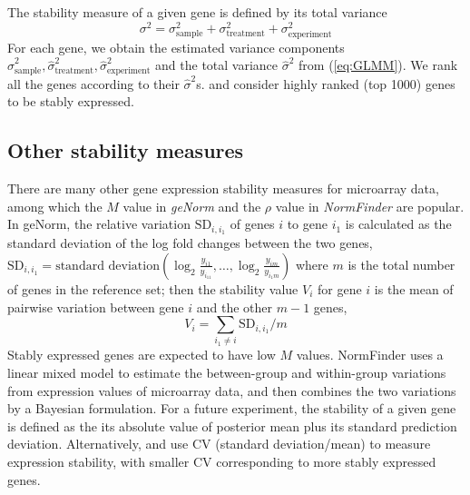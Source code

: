\documentclass[11pt, a4paper]{article}
\begin{document}
The stability measure of a given gene is defined by its total variance
 \begin{equation}\label{eq:totalVariance}
 \sigma^2 =\sigma_{\text{sample}}^2+ \sigma_{\text{treatment}}^2+ \sigma_{\text{experiment}}^2
 \end{equation}
For each gene, we obtain the estimated variance components $\hat\sigma_{\text{sample}}^2,  \hat\sigma_{\text{treatment}}^2,  \hat\sigma_{\text{experiment}}^2$ and the total variance $\hat\sigma^2$ from (\ref{eq:GLMM}).
We rank all the genes according to their $\hat\sigma^2$s. and consider highly ranked (top 1000) genes to be stably expressed. 

\subsection{Other stability measures}\label{subsection:OtherStabilityMeasure}
There are many other gene expression stability measures for microarray data, among which the $M$ value in \textit{geNorm} \citep{vandesompele2002accurate} and the $\rho$ value in \textit{NormFinder} \citep{andersen2004normalization} are popular. In geNorm, the relative variation $\text{SD}_{i, i_1}$ of genes $i$ to gene $i_1$ is calculated as the standard deviation of the log fold changes between the two genes, $\text{SD}_{i, i_1} = \text{standard deviation}(\log_2 \frac{y_{i1}}{y_{i_11}}, \ldots, \log_2 \frac{y_{im}}{y_{i_1m}})$ where $m$ is the total number of genes in the reference set; then the stability value $V_i$ for gene $i$ is the mean of pairwise variation between gene $i$ and the other $m-1$ genes, 
\begin{equation}\label{eq:vvalue}
V_i = \sum_{i_1 \neq i}\text{SD}_{i, i_1}/m
\end{equation}
Stably expressed genes are expected to have low $M$ values. NormFinder uses a linear mixed model to estimate the between-group and within-group variations from expression values of microarray data, and then combines the two variations by a Bayesian formulation. For a future experiment, the stability of a given gene is defined as the its absolute value of posterior mean plus its standard prediction deviation. Alternatively, \cite{czechowski2005genome} and \cite{dekkers2012identification} use CV (standard deviation/mean) to measure expression stability, with smaller CV  corresponding to more stably expressed genes.
	
\end{document}
